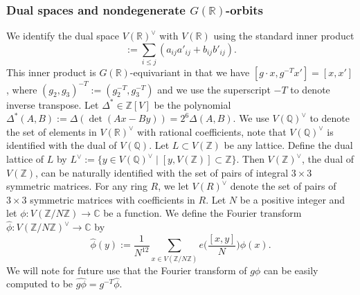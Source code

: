 \documentclass{article}
\def\Z{{\mathbb Z}}
\def\R{{\mathbb R}}
\def\Q{{\mathbb Q}}
\def\Z{{\mathbb Z}}
\def\Q{{\mathbb Q}}
\def\C{{\mathbb C}}
\begin{document}
\subsubsection*{Dual spaces and nondegenerate $G(\R)$-orbits} 
We identify the dual space $V(\R)^\vee$ with $V(\R)$ using the standard inner product 
\begin{equation*}
[(A,B),(A',B')]:=\sum_{i\leq j}(a_{ij}a'_{ij}+b_{ij}b'_{ij}).
\end{equation*}
This inner product is $G(\R)$-equivariant in that we have $[g\cdot x,g^{-T}x']=[x,x']$, where $(g_2,g_3)^{-T}:=(g_2^{-T},g_3^{-T})$ and we use the superscript $-T$ to denote inverse transpose. Let $\Delta^*\in\Z[V]$ be the polynomial $\Delta^*(A,B):=\Delta(\det(Ax-By))=2^6\Delta(A,B)$.
We use $V(\Q)^\vee$ to denote the set of elements in $V(\R)^\vee$ with rational coefficients, note that $V(\Q)^\vee$ is identified with the dual of $V(\Q)$. Let $L\subset V(\Z)$ be any lattice. Define the dual lattice of $L$ by $L^\vee:=\{y\in V(\Q)^\vee\mid [y,V(\Z)]\subset\Z\}$. Then $V(\Z)^\vee$, the dual of $V(\Z)$, can be naturally identified with the set of pairs of integral $3\times 3$ symmetric matrices. For any ring $R$, we let $V(R)^\vee$ denote the set of pairs of $3\times 3$ symmetric matrices with coefficients in $R$.
Let $N$ be a positive integer and let $\phi:V(\Z/N\Z)\to\C$ be a function. We define the Fourier transform $\widehat{\phi}:V(\Z/N\Z)^\vee\to\C$ by
\begin{equation*}
\widehat{\phi}(y):=\frac{1}{N^{12}}\sum_{x\in V(\Z/N\Z)} e\Big(\frac{[x,y]}{N}\Big)\phi(x).
\end{equation*}
We will note for future use that the Fourier transform of $g\phi$ can be easily computed to be $\widehat{g\phi}=g^{-T}\widehat{\phi}$.
\end{document}
